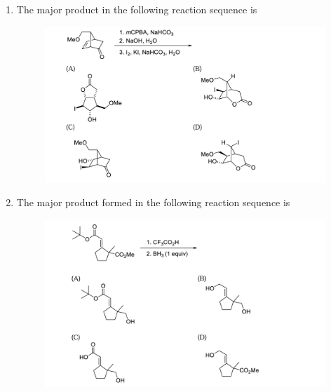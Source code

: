 \documentclass{article}
\begin{document}
\begin{enumerate}
\item The major product in the following reaction sequence is
\begin{figure}[H]
    \centering
    \includegraphics[width=1\columnwidth]{figures/cy_q29.png}
    \label{fig:placeholder}
\end{figure}

\item  The major product formed in the following reaction sequence is 
\begin{figure}[H]
    \centering
    \includegraphics[width=1\columnwidth]{figures/cy_q30.png}
    \label{fig:placeholder}
\end{figure}


\end{enumerate}
\end{document}
